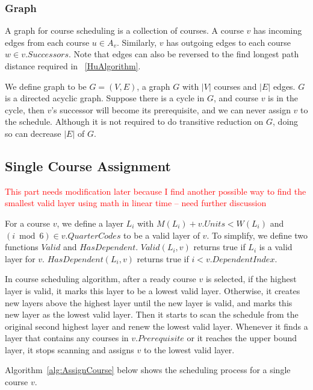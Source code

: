 \documentclass[letterpaper,12pt]{article}
\theoremstyle{definition}
\begin{document}
\subsubsection{Graph}
A graph for course scheduling is a collection of courses. A course $v$ has incoming edges from each course $u\in A_v$. Similarly, $v$ has outgoing edges to each course $w\in v.Successors$. Note that edges can also be reversed to the find longest path distance required in ~\ref{HuAlgorithm}. 

We define graph to be $G=(V,E)$, a graph $G$ with $|V|$ courses and $|E|$ edges. $G$ is a directed acyclic graph. Suppose there is a cycle in $G$, and course $v$ is in the cycle, then $v$'s successor will become its prerequisite, and we can never assign $v$ to the schedule. Although it is not required to do transitive reduction on $G$, doing so can decrease $|E|$ of $G$. 

\subsection{Single Course Assignment}
\textcolor{red}{This part needs modification later because I find another possible way to find the smallest valid layer using math in linear time -- need further discussion}

For a course $v$, we define a layer $L_i$ with $M(L_i) + v.Units < W(L_i)$ and $(i \bmod 6)\in v.QuarterCodes$ to be a valid layer of $v$. To simplify, we define two functions $Valid$ and $HasDependent$. $Valid(L_i,v)$ returns true if $L_i$ is a valid layer for $v$. $HasDependent(L_i,v)$ returns true if $i<v.DependentIndex$.

In course scheduling algorithm, after a ready course $v$ is selected, if the highest layer is valid, it marks this layer to be a lowest valid layer. Otherwise, it creates new layers above the highest layer until the new layer is valid, and marks this new layer as the lowest valid layer. Then it starts to scan the schedule from the original second highest layer and renew the lowest valid layer. Whenever it finds a layer that contains any courses in $v.Prerequisite$ or it reaches the upper bound layer, it stops scanning and assigns $v$ to the lowest valid layer.

Algorithm~\ref{alg:AssignCourse} below shows the scheduling process for a single course $v$. 
\end{document}
